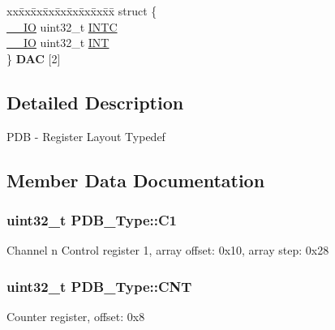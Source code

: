 \begin{DoxyCompactItemize}
\begin{tabbing}
\end{tabbing}\item 
\begin{tabbing}
xx\=xx\=xx\=xx\=xx\=xx\=xx\=xx\=xx\=\kill
struct \{\\
\>\hyperlink{core__sc300_8h_aec43007d9998a0a0e01faede4133d6be}{\_\_IO} uint32\_t \hyperlink{structPDB__Type_a7243b34a966694845cbbd4f5c614e986}{INTC}\\
\>\hyperlink{core__sc300_8h_aec43007d9998a0a0e01faede4133d6be}{\_\_IO} uint32\_t \hyperlink{structPDB__Type_ae769221841ab03c4c16643108c5f5a0c}{INT}\\
\} {\bfseries DAC} \mbox{[}2\mbox{]}\hypertarget{structPDB__Type_a7dceed805933b5b86863687bb6078994}{}\label{structPDB__Type_a7dceed805933b5b86863687bb6078994}
\\

\end{tabbing}\end{DoxyCompactItemize}


\subsection{Detailed Description}
P\+DB -\/ Register Layout Typedef 

\subsection{Member Data Documentation}
\subsubsection[{\texorpdfstring{C1}{C1}}]{ uint32\+\_\+t P\+D\+B\+\_\+\+Type\+::\+C1}\hypertarget{structPDB__Type_a08fc04ae996dc8dcbb0d61921b486a68}{}\label{structPDB__Type_a08fc04ae996dc8dcbb0d61921b486a68}
Channel n Control register 1, array offset\+: 0x10, array step\+: 0x28 
\subsubsection[{\texorpdfstring{C\+NT}{CNT}}]{ uint32\+\_\+t P\+D\+B\+\_\+\+Type\+::\+C\+NT}\hypertarget{structPDB__Type_ac0196244d0c47eaf8fb40c53a3babd8e}{}\label{structPDB__Type_ac0196244d0c47eaf8fb40c53a3babd8e}
Counter register, offset\+: 0x8 
